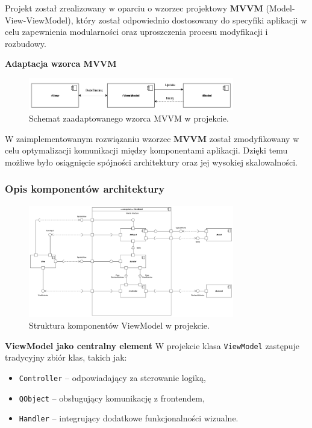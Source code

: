 Projekt został zrealizowany w oparciu o wzorzec projektowy \textbf{MVVM} (Model-View-ViewModel), który został odpowiednio dostosowany do specyfiki aplikacji w celu zapewnienia modularności oraz uproszczenia procesu modyfikacji i rozbudowy.

\textbf{Adaptacja wzorca MVVM}
\begin{figure}[h!]
    \centering
    \includegraphics[width=0.8\textwidth]{img/diagramy/architektura.png}
    \caption{Schemat zaadaptowanego wzorca MVVM w projekcie.}
\end{figure}

W zaimplementowanym rozwiązaniu wzorzec \textbf{MVVM} został zmodyfikowany w celu optymalizacji komunikacji między komponentami aplikacji. Dzięki temu możliwe było osiągnięcie spójności architektury oraz jej wysokiej skalowalności.

\subsubsection{Opis komponentów architektury}
\begin{figure}[h!]
    \centering
    \includegraphics[width=0.8\textwidth]{img/diagramy/diagram_komp_vm.png}
    \caption{Struktura komponentów ViewModel w projekcie.}
\end{figure}

\textbf{ViewModel jako centralny element}
W projekcie klasa \texttt{ViewModel} zastępuje tradycyjny zbiór klas, takich jak:
\begin{itemize}
    \item \texttt{Controller} -- odpowiadający za sterowanie logiką,
    \item \texttt{QObject} -- obsługujący komunikację z frontendem,
    \item \texttt{Handler} -- integrujący dodatkowe funkcjonalności wizualne.
\end{itemize}

